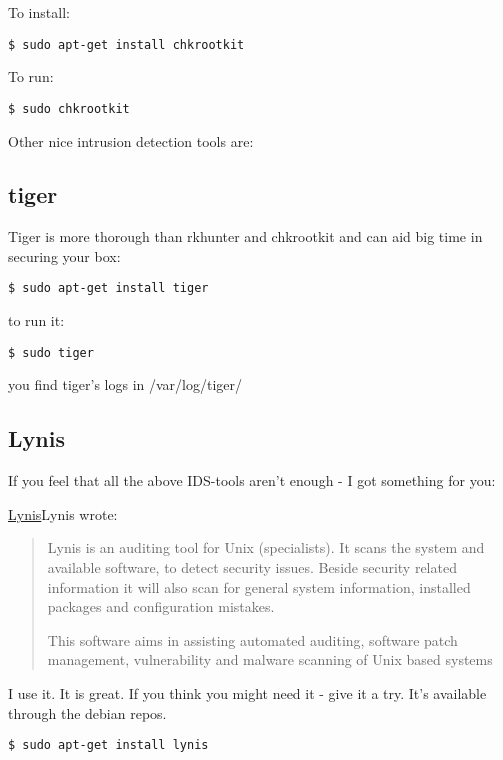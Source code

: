 \documentclass{article}
\begin{document}
 To install:
\begin{lstlisting}
$ sudo apt-get install chkrootkit
\end{lstlisting}



 To run:
\begin{lstlisting}
$ sudo chkrootkit
\end{lstlisting}



 Other nice intrusion detection tools are: 
\subsection{tiger}


 Tiger is more thorough than rkhunter and chkrootkit and can aid big time in securing your box:
\begin{lstlisting}
$ sudo apt-get install tiger 
\end{lstlisting}



 to run it: 
\begin{lstlisting}
$ sudo tiger
\end{lstlisting}



 you find tiger's logs in /var/log/tiger/
\subsection{Lynis}


 If you feel that all the above IDS-tools aren't enough - I got something for you:


 \href{http://www.rootkit.nl/projects/lynis.html}{Lynis}{\sc Lynis wrote:}\begin{quotation}


 Lynis is an auditing tool for Unix (specialists). It scans the system and available software, to detect security issues. Beside security related information it will also scan for general system information, installed packages and configuration mistakes.


 This software aims in assisting automated auditing, software patch management, vulnerability and malware scanning of Unix based systems\end{quotation}


 I use it. It is great. If you think you might need it - give it a try. It's available through the debian repos.
\begin{lstlisting}
$ sudo apt-get install lynis
\end{lstlisting}
\end{document}
